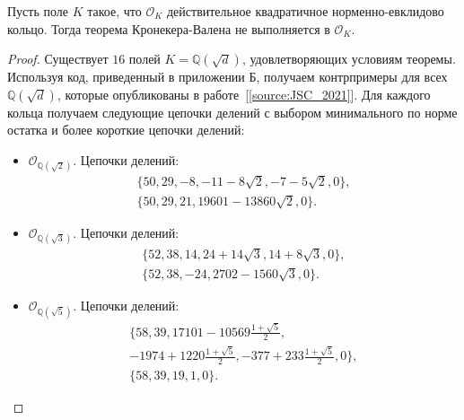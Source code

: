 \documentclass[_00_dissertation.tex]{subfiles}
\begin{document}
\begin{theorem}\label{theorem:kronecker}
    Пусть поле $K$ такое, что $\mathcal{O}_K$ действительное квадратичное норменно-евклидово кольцо.
    Тогда теорема Кронекера-Валена не выполняется в $\mathcal{O}_K$.
\end{theorem}
\begin{proof}
    Существует $16$ полей $K = \mathbb{Q}(\sqrt{d})$, удовлетворяющих условиям теоремы.
    Используя код, приведенный в приложении Б, получаем контрпримеры для всех $\mathbb{Q}(\sqrt{d})$, которые опубликованы в работе~[\ref{source:JSC_2021}].
    Для каждого кольца получаем следующие цепочки делений с выбором минимального по норме остатка и более короткие цепочки делений:
    \begin{itemize}
        \item $\mathcal{O}_{\mathbb{Q}(\sqrt{2})}$.
        Цепочки делений:
        \begin{equation*}
            \begin{split}
                \{50, 29, -8, -11-8\sqrt{2}, -7-5\sqrt{2}, 0\},\\
                \{50, 29, 21, 19601-13860\sqrt{2}, 0\}.
            \end{split}
        \end{equation*}
    
        \item $\mathcal{O}_{\mathbb{Q}(\sqrt{3})}$.
        Цепочки делений:
        \begin{equation*}
            \begin{split}
                \{52, 38, 14, 24+14\sqrt{3}, 14+8\sqrt{3}, 0\},\\
                \{52, 38, -24, 2702-1560\sqrt{3}, 0\}.
            \end{split}
        \end{equation*}
    
        \item $\mathcal{O}_{\mathbb{Q}(\sqrt{5})}$.
        Цепочки делений:
        \begin{equation*}
            \begin{split}
                \{58, 39, 17101-10569\frac{1+\sqrt{5}}{2},\\
                    -1974+1220\frac{1+\sqrt{5}}{2}, -377+233\frac{1+\sqrt{5}}{2}, 0\},\\
                \{58, 39, 19, 1, 0\}.
            \end{split}
        \end{equation*}
    

\end{itemize}
\end{proof}
\end{document}
